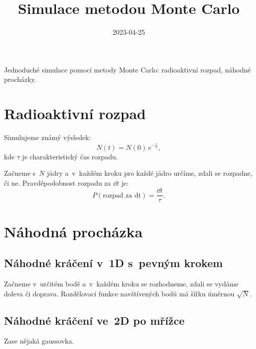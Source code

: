 \documentclass[a4paper]{article}
\title{Simulace metodou Monte Carlo}
\date{2023-04-25}
\begin{document}
Jednoduché simulace pomocí metody Monte Carlo:
radioaktivní rozpad, náhodné procházky.

\section{Radioaktivní rozpad}
Simulujeme známý výsledek:
\begin{equation}
    N(t) = N(0) \, e^{-\frac{t}{\tau}},
\end{equation}
kde $\tau$ je charakteristický čas rozpadu.

Začneme s~$N$ jádry a~v~každém kroku pro každé jádro určíme,
zdali se rozpadne, či ne.
Pravděpodobnost rozpadu za $\dd{t}$ je:
\begin{equation}
    P(\text{rozpad za dt}) = \frac{\dd{t}}{\tau}.
\end{equation}

\section{Náhodná procházka}
\subsection{Náhodné kráčení v~1D s~pevným krokem}
Začneme v~určitém bodě a~v~každém kroku se rozhodneme,
zdali se vydáme doleva či doprava.
Rozdělovací funkce navštívených bodů má šířku úměrnou $\sqrt{N}$.

\subsection{Náhodné kráčení ve~2D po mřížce}
Zase nějaká gaussovka.
\end{document}
